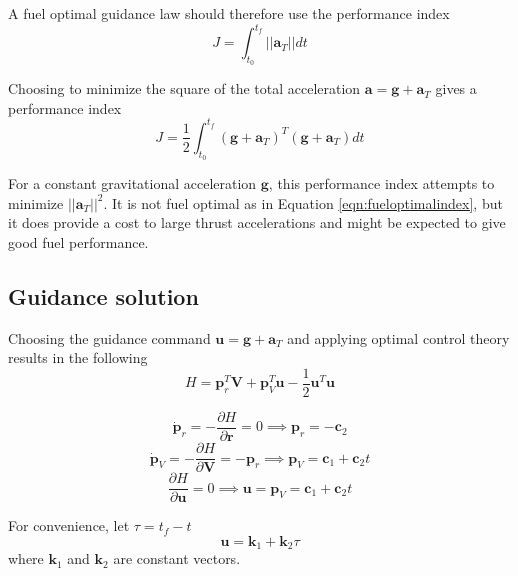 A fuel optimal guidance law should therefore use the performance index
\begin{equation}
\label{eqn:fueloptimalindex}
J = \int_{t_0}^{t_f} ||\boldsymbol{a}_T||dt
\end{equation}

Choosing to minimize the square of the total acceleration $\boldsymbol{a} = \boldsymbol{g} + \boldsymbol{a}_T$ gives a performance index
\begin{equation}
\label{eqn:performanceindex}
J = \frac{1}{2} \int_{t_0}^{t_f} (\boldsymbol{g}+\boldsymbol{a}_T)^T(\boldsymbol{g}+\boldsymbol{a}_T)dt
\end{equation}

For a constant gravitational acceleration $\boldsymbol{g}$, this performance index attempts to minimize $||\boldsymbol{a}_T||^2$. It is not fuel optimal as in Equation \ref{eqn:fueloptimalindex}, but it does provide a cost to large thrust accelerations and might be expected to give good fuel performance.

\subsection{Guidance solution}
Choosing the guidance command $\boldsymbol{u} = \boldsymbol{g} + \boldsymbol{a}_T$ and applying optimal control theory results in the following
\begin{equation}
\label{eqn:Hamiltonian}
H = \boldsymbol{p}_r^T\boldsymbol{V} + \boldsymbol{p}_V^T\boldsymbol{u} - \frac{1}{2}\boldsymbol{u}^T\boldsymbol{u}
\end{equation}

\begin{equation*}
\dot{\boldsymbol{p}}_r = -\frac{\partial H}{\partial \boldsymbol{r}} = 0 \implies \boldsymbol{p}_r = -\boldsymbol{c}_2
\end{equation*}
\begin{equation*}
\dot{\boldsymbol{p}}_V = -\frac{\partial H}{\partial \boldsymbol{V}} = -\boldsymbol{p}_r \implies \boldsymbol{p}_V = \boldsymbol{c}_1 + \boldsymbol{c}_2 t
\end{equation*}
\begin{equation*}
\frac{\partial H}{\partial \boldsymbol{u}} = 0 \implies \boldsymbol{u} = \boldsymbol{p}_V = \boldsymbol{c}_1 + \boldsymbol{c}_2 t
\end{equation*}

For convenience, let $\tau = t_f - t$
\begin{equation}
\label{eqn:command}
\boldsymbol{u} = \boldsymbol{k}_1 + \boldsymbol{k}_2 \tau
\end{equation}
where $\boldsymbol{k}_1$ and $\boldsymbol{k}_2$ are constant vectors.

